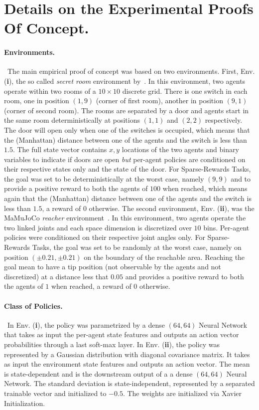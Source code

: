 \section{Details on the Experimental Proofs Of Concept.}
\label{apx:exp}

\paragraph*{Environments.}~The main empirical proof of concept was based on two environments. First, Env. (\textbf{i}), the so called \emph{secret room} environment by~\citet{liu2021cooperative}. In this environment, two agents operate within two rooms of a $10\times10$ discrete grid. There is one switch in each room, one in position $(1,9)$ (corner of first room), another in position $(9,1)$ (corner of second room). The rooms are separated by a door and agents start in the same room deterministically at positions $(1,1)$ and $(2,2)$ respectively. The door will open only when one of the switches is occupied, which means that the (Manhattan) distance between one of the agents and the switch is less than $1.5$. The full state vector contains $x, y$ locations of the two agents and binary variables to indicate if doors are open \emph{but} per-agent policies are conditioned on their respective states only and the state of the door. For Sparse-Rewards Tasks, the goal was set to be deterministically at the worst case, namely $(9,9)$ and to provide a positive reward to both the agents of $100$ when reached, which means again that the (Manhattan) distance between one of the agents and the switch is less than $1.5$, a reward of $0$ otherwise. The second environment, Env. (\textbf{ii}), was the MaMuJoCo \emph{reacher} environment~\cite{peng2021facmac}. In this environment, two agents operate the two linked joints and each space dimension is discretized over $10$ bins. Per-agent policies were conditioned on their respective joint angles only.  For Sparse-Rewards Tasks, the goal was set to be randomly at the worst case, namely on position $(\pm0.21, \pm0.21)$ on the boundary of the reachable area. Reaching the goal mean to have a tip position (not observable by the agents and not discretized) at a distance less that $0.05$ and provides a positive reward to both the agents of $1$ when reached, a reward of $0$ otherwise. 

\paragraph*{Class of Policies.}~In Env. (\textbf{i}), the policy was parametrized by a dense $(64,64)$ Neural Network that takes as input the per-agent state features and outputs an action vector probabilities through a last soft-max layer. In Env. (\textbf{ii}), the policy was represented by a Gaussian distribution with diagonal covariance matrix. It takes as input the environment state features and outputs an action vector. The mean is state-dependent and is the downstream output of a a dense $(64,64)$ Neural Network. The standard deviation is state-independent, represented by a separated trainable vector and initialized to $-0.5$. The weights are initialized via Xavier Initialization.

